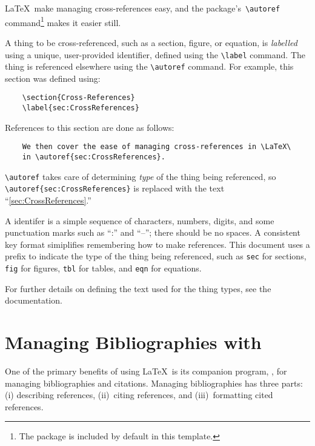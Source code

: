 \LaTeX\ make managing cross-references easy, and the 
package's\ \verb+\autoref+ command\footnote{%
    The  package is included by default in this
    template.}
makes it easier still. 

A thing to be cross-referenced, such as a section, figure, or equation,
is \emph{labelled} using a unique, user-provided identifier, defined
using the \verb+\label+ command.  
The thing is referenced elsewhere using the \verb+\autoref+ command.
For example, this section was defined using:
\begin{lstlisting}
    \section{Cross-References}
    \label{sec:CrossReferences}
\end{lstlisting}
References to this section are done as follows:
\begin{lstlisting}
    We then cover the ease of managing cross-references in \LaTeX\
    in \autoref{sec:CrossReferences}.
\end{lstlisting}
\verb+\autoref+ takes care of determining \emph{type} of the 
thing being referenced, so \verb+\autoref{sec:CrossReferences}+
is replaced with the text ``\autoref{sec:CrossReferences}.''

A identifer is a simple sequence of characters, numbers, digits,
and some punctuation marks such as ``:'' and ``--''; there should
be no spaces.  A consistent key format simiplifies remembering how
to make references.  This document uses a prefix to indicate the
type of the thing being referenced, such as \texttt{sec} for sections,
\texttt{fig} for figures, \texttt{tbl} for tables, and \texttt{eqn}
for equations.

For further details on defining the text used for the thing types,
see the \package{hyperref} documentation.


\section{Managing Bibliographies with \BibTeX}
\label{sec:BibTeX}

One of the primary benefits of using \LaTeX\ is its companion program,
\BibTeX, for managing bibliographies and citations.  Managing
bibliographies has three parts: (i) describing references,
(ii)~citing references, and (iii)~formatting cited references.

